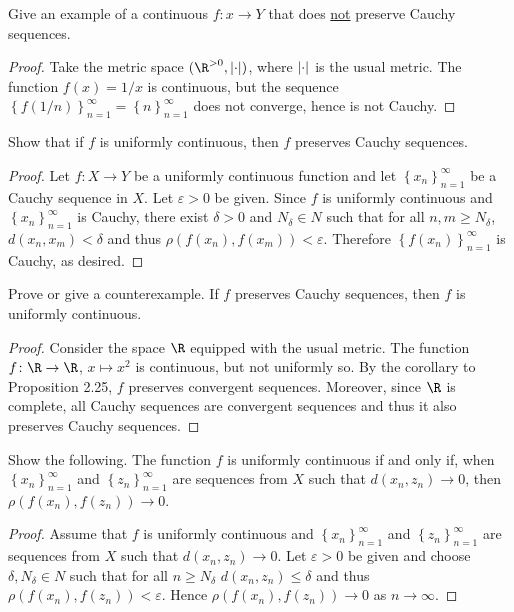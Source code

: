 \documentclass[12pt]{amsart}
\begin{document}
\begin{setup}
  \begin{ex}
    Give an example of a continuous $f \colon x \rightarrow Y$ that does \underline{not} preserve Cauchy sequences.
    \begin{proof}
      Take the metric space $(\R^{>0}, \abs{\cdot})$, where $\left| \cdot \right|$ is the usual metric.
      The function $f(x) = 1/x$ is continuous, but the sequence $\left\{f(1/n)\right\}_{n=1}^\infty = \left\{n\right\}_{n=1}^\infty$ does not converge, hence is not Cauchy.
    \end{proof}
  \end{ex}
  
  \begin{ex}
    Show that if $f$ is uniformly continuous, then $f$ preserves Cauchy sequences.
    \begin{proof}
      Let $f \colon X \rightarrow Y$ be a uniformly continuous function and let $\left\{x_n\right\}_{n=1}^\infty$ be a Cauchy sequence in $X$.
      Let $\varepsilon > 0$ be given.
      Since $f$ is uniformly continuous and $\left\{x_n\right\}_{n=1}^\infty$ is Cauchy, there exist $\delta > 0$ and $N_\delta \in N$ such that for all $n,m \geq N_\delta$, $d(x_n, x_m) < \delta$ and thus $\rho(f(x_n), f(x_m)) < \varepsilon$.
      Therefore $\left\{f(x_n)\right\}_{n=1}^\infty$ is Cauchy, as desired.
    \end{proof}
  \end{ex}
  
  \begin{ex}
    Prove or give a counterexample.
    If $f$ preserves Cauchy sequences, then $f$ is uniformly continuous.
    \begin{proof}
      Consider the space $\R$ equipped with the usual metric.
      The function $f \colon \R \rightarrow \R$, $x \mapsto x^2$ is continuous, but not uniformly so.
      By the corollary to Proposition 2.25, $f$ preserves convergent sequences.
      Moreover, since $\R$ is complete, all Cauchy sequences are convergent sequences and thus it also preserves Cauchy sequences.
    \end{proof}
  \end{ex}

  \begin{ex}
    Show the following.
    The function $f$ is uniformly continuous if and only if, when $\left\{x_n\right\}_{n=1}^\infty$ and $\left\{z_n\right\}_{n=1}^\infty$ are sequences from $X$ such that $d(x_n, z_n) \rightarrow 0$, then $\rho(f(x_n), f(z_n)) \rightarrow 0$.
    \begin{proof}
      Assume that $f$ is uniformly continuous and $\left\{x_n\right\}_{n=1}^\infty$ and $\left\{z_n\right\}_{n=1}^\infty$ are sequences from $X$ such that $d(x_n, z_n) \rightarrow 0$.
      Let $\varepsilon > 0$ be given and choose $\delta, N_\delta \in N$ such that for all $n \geq N_\delta$ $d(x_n, z_n) \leq \delta$ and thus $\rho(f(x_n), f(z_n)) < \varepsilon$.
      Hence $\rho(f(x_n), f(z_n)) \rightarrow 0$ as $n \rightarrow \infty$.
      

\end{proof}
\end{ex}
\end{setup}
\end{document}
